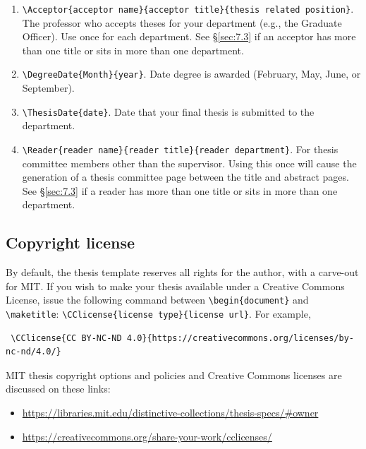 \documentclass[11pt]{article}
\begin{document}
\begin{enumerate}
\item \verb|\Acceptor{acceptor name}{acceptor title}{thesis related position}|. The professor who accepts theses for your department (e.g., the Graduate Officer). Use once for each department. See \S\ref{sec:7.3} if an acceptor has more than one title or sits in more than one department.

\item \verb|\DegreeDate{Month}{year}|. Date degree is awarded (February, May, June, or September).  

\item \verb|\ThesisDate{date}|. Date that your final thesis is submitted to the department.

\item \verb|\Reader{reader name}{reader title}{reader department}|. For thesis committee members other than the supervisor. Using this once will cause the generation of a thesis committee page between the title and abstract pages. See \S\ref{sec:7.3} if a reader has more than one title or sits in more than one department.

\end{enumerate}

\subsection{Copyright license}
By default, the thesis template reserves all rights for the author, with a carve-out for MIT.  If you wish to make your thesis available under a Creative Commons License, issue the following command between
\verb|\begin{document}| and \verb|\maketitle|: \verb|\CClicense{license type}{license url}|.  For example,

\begin{verbatim}
 \CClicense{CC BY-NC-ND 4.0}{https://creativecommons.org/licenses/by-nc-nd/4.0/}
\end{verbatim}
\noindent MIT thesis copyright options and policies and Creative Commons licenses are discussed on these links:
\begin{itemize}[para-vspace=0em,item-vspace=0pt,begin-vspace=5pt]%
\item\url{https://libraries.mit.edu/distinctive-collections/thesis-specs/#owner}
\item\url{https://creativecommons.org/share-your-work/cclicenses/}
\end{itemize}
\end{document}

